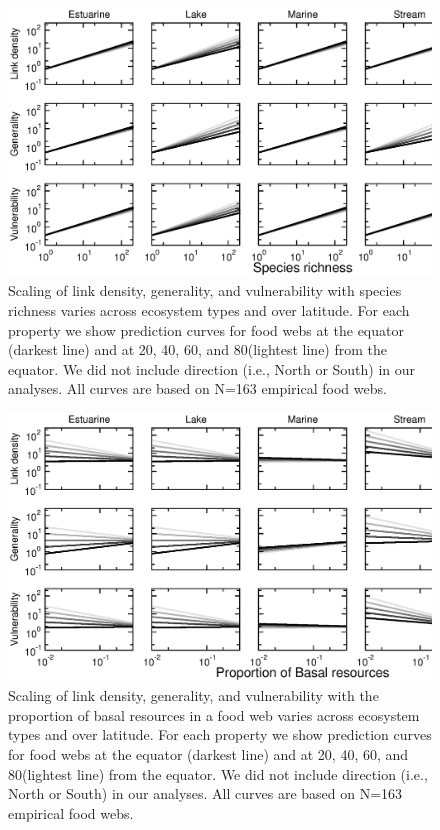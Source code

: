 \documentclass[12pt]{article}
\begin{document}
\begin{figure}[h]
\includegraphics[width=.85\textwidth]{Figures/by_TL/scaling_with_S/proportions/S_latlines_nonts.eps}
\caption{Scaling of link density, generality, and vulnerability with species richness
varies across ecosystem types and over latitude. For each property we show 
prediction curves for food webs at the equator (darkest line) and at 
20\degree, 40\degree, 60\degree, and 80\degree (lightest line) from the 
equator. We did not include direction (i.e., North or South) in our analyses. 
All curves are based on N=163 empirical food webs.}
\label{S}
\end{figure}


\begin{figure}[!H]
\includegraphics[width=.9\textwidth]{Figures/by_TL/scaling_with_S/proportions/B_latlines_nonts.eps}
\caption{Scaling of link density, generality, and vulnerability 
with the proportion of basal resources in a food web
varies across ecosystem types and over latitude. For each property we show 
prediction curves for food webs at the equator (darkest line) and at 
20\degree, 40\degree, 60\degree, and 80\degree (lightest line) from the 
equator. We did not include direction (i.e., North or South) in our analyses. 
All curves are based on N=163 empirical food webs.}
\label{B}
\end{figure}
\end{document}
